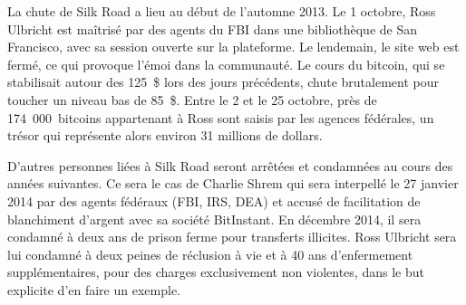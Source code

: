 La chute de Silk Road a lieu au début de l'automne 2013. Le 1\ier{} octobre, Ross Ulbricht est maîtrisé par des agents du FBI dans une bibliothèque de San Francisco, avec sa session ouverte sur la plateforme. Le lendemain, le site web est fermé, ce qui provoque l'émoi dans la communauté. Le cours du bitcoin, qui se stabilisait autour des 125~\$ lors des jours précédents, chute brutalement pour toucher un niveau bas de 85~\$. Entre le 2 et le 25 octobre, près de 174~000~bitcoins appartenant à Ross sont saisis par les agences fédérales, un trésor qui représente alors environ 31 millions de dollars.

D'autres personnes liées à Silk Road seront arrêtées et condamnées au cours des années suivantes. Ce sera le cas de Charlie Shrem qui sera interpellé le 27 janvier 2014 par des agents fédéraux (FBI, IRS, DEA) et accusé de facilitation de blanchiment d'argent avec sa société BitInstant. En décembre 2014, il sera condamné à deux ans de prison ferme pour transferts illicites. Ross Ulbricht sera lui condamné à deux peines de réclusion à vie et à 40 ans d'enfermement supplémentaires, pour des charges exclusivement non violentes, dans le but explicite d'en faire un exemple. %

